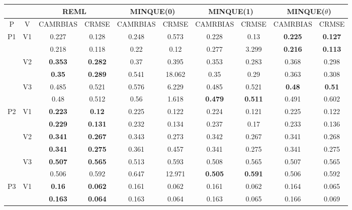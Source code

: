 \documentclass[12pt,a4paper]{article}
\begin{document}
\begin{sidewaystable}[ht]
\centering
{\footnotesize
\begin{tabular}{cc|cc|cc|cc|cc|}
   & & \multicolumn{2}{c|}{REML}&\multicolumn{2}{c|}{MINQUE(0)}&\multicolumn{2}{c|}{MINQUE(1)}&\multicolumn{2}{c|}{MINQUE($\theta$)}\\ \hline
P & V & CAMRBIAS & CRMSE & CAMRBIAS & CRMSE & CAMRBIAS & CRMSE & CAMRBIAS & CRMSE \\ 
  \hline
\multirow{6}{*}{P1} & \multirow{2}{*}{V1} & 0.227 & 0.128 & 0.248 & 0.573 & 0.228 & 0.13 & \textbf{0.225} & \textbf{0.127} \\ 
   &  & 0.218 & 0.118 & 0.22 & 0.12 & 0.277 & 3.299 & \textbf{0.216} & \textbf{0.113} \\ 
   & \multirow{2}{*}{V2} & \textbf{0.353} & \textbf{0.282} & 0.37 & 0.395 & 0.353 & 0.283 & 0.368 & 0.298 \\ 
   &  & \textbf{0.35} & \textbf{0.289} & 0.541 & 18.062 & 0.35 & 0.29 & 0.363 & 0.308 \\ 
   & \multirow{2}{*}{V3} & 0.485 & 0.521 & 0.576 & 6.229 & 0.485 & 0.521 & \textbf{0.48} & \textbf{0.51} \\ 
   &  & 0.48 & 0.512 & 0.56 & 1.618 & \textbf{0.479} & \textbf{0.511} & 0.491 & 0.602 \\ 
   \hline \hline\multirow{6}{*}{P2} & \multirow{2}{*}{V1} & \textbf{0.223} & \textbf{0.12} & 0.225 & 0.122 & 0.224 & 0.121 & 0.225 & 0.122 \\ 
   &  & \textbf{0.229} & \textbf{0.131} & 0.232 & 0.134 & 0.237 & 0.17 & 0.233 & 0.136 \\ 
   & \multirow{2}{*}{V2} & \textbf{0.341} & \textbf{0.267} & 0.343 & 0.273 & 0.342 & 0.267 & 0.341 & 0.268 \\ 
   &  & \textbf{0.341} & \textbf{0.275} & 0.361 & 0.457 & 0.341 & 0.275 & 0.341 & 0.275 \\ 
   & \multirow{2}{*}{V3} & \textbf{0.507} & \textbf{0.565} & 0.513 & 0.593 & 0.508 & 0.565 & 0.507 & 0.565 \\ 
   &  & 0.506 & 0.592 & 0.647 & 12.971 & \textbf{0.505} & \textbf{0.591} & 0.506 & 0.592 \\ 
   \hline \hline\multirow{6}{*}{P3} & \multirow{2}{*}{V1} & \textbf{0.16} & \textbf{0.062} & 0.161 & 0.062 & 0.161 & 0.062 & 0.164 & 0.065 \\ 
   &  & \textbf{0.163} & \textbf{0.064} & 0.163 & 0.064 & 0.163 & 0.065 & 0.166 & 0.069 \\ 

\end{tabular}}
\end{sidewaystable}
\end{document}

